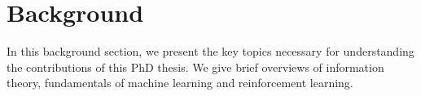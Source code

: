     \chapter{Background}

In this background section, we present the key topics necessary for understanding the contributions of this PhD thesis. We give brief overviews of information theory, fundamentals of machine learning and reinforcement learning. 





